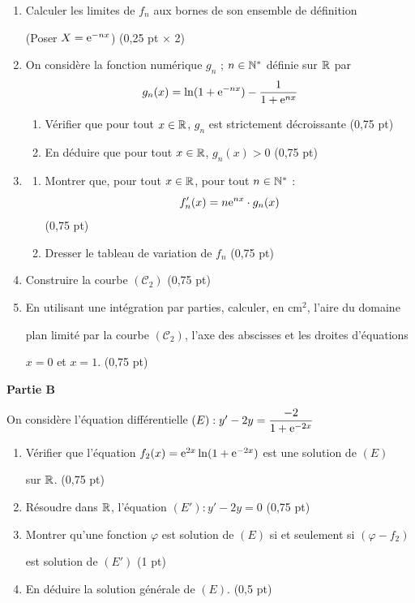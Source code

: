 \begin{enumerate}
	\item Calculer les limites de $f_n$ aux bornes de son ensemble de définition

	(Poser $X = \mathrm{e}^{-nx}$) \hfill (0,25 pt $\times$ 2)
	\item On considère la fonction numérique $g_n$ ; $n \in \mathbb{N}^*$ définie sur $\mathbb{R}$ par
	$$
	g_n(x) = \ln(1+\mathrm{e}^{-nx}) - \frac{1}{1+\mathrm{e}^{nx}}
	$$
	\begin{enumerate}
		\item Vérifier que pour tout $x \in \mathbb{R}$, $g_n$ est strictement décroissante \hfill (0,75 pt)
		\item En déduire que pour tout $x \in \mathbb{R}$, $g_n(x) > 0$ \hfill (0,75 pt)
	\end{enumerate}
	\item
	\begin{enumerate}
		\item Montrer que, pour tout $x \in \mathbb{R}$, pour tout $n \in \mathbb{N}^*$ :
		$$
		f_n'(x) = n\mathrm{e}^{nx}\cdot g_n(x)
		$$
		\hfill (0,75 pt)
		\item Dresser le tableau de variation de $f_n$ \hfill (0,75 pt)
	\end{enumerate}
	\item Construire la courbe $(\mathscr{C}_2)$ \hfill (0,75 pt)
	\item En utilisant une intégration par parties, calculer, en $\text{cm}^2$, l'aire du domaine

	plan limité par la courbe $(\mathscr{C}_2)$, l'axe des abscisses et les droites d'équations

	$x = 0$ et $x = 1$. \hfill (0,75 pt)
\end{enumerate}

\medskip
\noindent\textbf{Partie B}

On considère l'équation différentielle $(E) : y' - 2y = \dfrac{-2}{1+\mathrm{e}^{-2x}}$

\begin{enumerate}
	\item Vérifier que l'équation $f_2(x) = \mathrm{e}^{2x}\ln(1+\mathrm{e}^{-2x})$ est une solution de $(E)$

	sur $\mathbb{R}$. \hfill (0,75 pt)
	\item Résoudre dans $\mathbb{R}$, l'équation $(E') : y' - 2y = 0$ \hfill (0,75 pt)
	\item Montrer qu'une fonction $\varphi$ est solution de $(E)$ si et seulement si $(\varphi - f_2)$

	est solution de $(E')$ \hfill (1 pt)
	\item En déduire la solution générale de $(E)$. \hfill (0,5 pt)
\end{enumerate}
